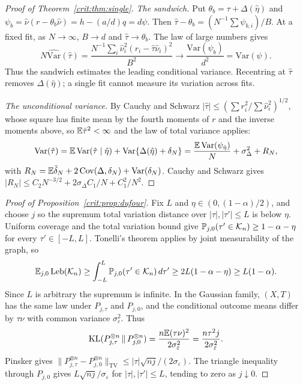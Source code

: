 \begin{proof}[Proof of Theorem~\ref{crit:thm:single}]
\emph{The sandwich.} Put $\theta_b=\tau+\Delta(\hat\eta)$ and $\psi_b=\hat\nu(r-\theta_b\hat\nu)=h-(a/d)q=d\psi$. Then $\hat\tau-\theta_b=(N^{-1}\sum\psi_{b,i})/B$. At a fixed fit, as $N\to\infty$, $B\to d$ and $\hat\tau\to\theta_b$. The law of large numbers gives
\[
N\widehat{\mathrm{Var}}(\hat\tau)=\frac{N^{-1}\sum_i\hat\nu_i^2(r_i-\hat\tau\hat\nu_i)^2}{B^2}\longrightarrow\frac{\mathrm{Var}(\psi_b)}{d^2}=\mathrm{Var}(\psi).
\]
Thus the sandwich estimates the leading conditional variance. Recentring at $\hat\tau$ removes $\Delta(\hat\eta)$; a single fit cannot measure its variation across fits.

\emph{The unconditional variance.} By Cauchy and Schwarz $|\hat\tau| \le (\sum r_i^2/\sum\hat\nu_i^2)^{1/2}$, whose square has finite mean by the fourth moments of $r$ and the inverse moments above, so $\mathbb{E}\hat\tau^2 < \infty$ and the law of total variance applies:
\[
\mathrm{Var}(\hat\tau) = \mathbb{E}\,\mathrm{Var}(\hat\tau \mid \hat\eta) + \mathrm{Var}\{\Delta(\hat\eta) + \delta_N\} = \frac{\mathbb{E}\,\mathrm{Var}(\psi_{\hat\eta})}{N} + \sigma_\Delta^2 + R_N,
\]
with $R_N = \mathbb{E}\tilde\delta_N + 2\,\mathrm{Cov}(\Delta, \delta_N) + \mathrm{Var}(\delta_N)$. Cauchy and Schwarz gives $|R_N| \le C_2N^{-3/2} + 2\sigma_\Delta C_1/N + C_1^2/N^2$.
\end{proof}

\begin{proof}[Proof of Proposition~\ref{crit:prop:dufour}]
Fix $L$ and $\eta\in(0,(1-\alpha)/2)$, and choose $j$ so the supremum total variation distance over $|\tau|,|\tau'|\le L$ is below $\eta$. Uniform coverage and the total variation bound give $\mathbb{P}_{j,0}(\tau'\in\mathcal K_n)\ge1-\alpha-\eta$ for every $\tau'\in[-L,L]$. Tonelli's theorem applies by joint measurability of the graph, so
\[
\mathbb{E}_{j,0}\,\mathrm{Leb}(\mathcal K_n)\ge\int_{-L}^{L}\mathbb{P}_{j,0}(\tau'\in\mathcal K_n)\,d\tau'\ge2L(1-\alpha-\eta)\ge L(1-\alpha).
\]
Since $L$ is arbitrary the supremum is infinite. In the Gaussian family, $(X,T)$ has the same law under $P_{j,\tau}$ and $P_{j,0}$, and the conditional outcome means differ by $\tau\nu$ with common variance $\sigma_\varepsilon^2$. Thus
\[
\mathrm{KL}(P_{j,\tau}^{\otimes n}\,\|\,P_{j,0}^{\otimes n})=\frac{n\mathbb{E}(\tau\nu)^2}{2\sigma_\varepsilon^2}=\frac{n\tau^2j}{2\sigma_\varepsilon^2}.
\]
Pinsker gives $\|P_{j,\tau}^{\otimes n}-P_{j,0}^{\otimes n}\|_{\mathrm{TV}}\le|\tau|\sqrt{nj}/(2\sigma_\varepsilon)$. The triangle inequality through $P_{j,0}$ gives $L\sqrt{nj}/\sigma_\varepsilon$ for $|\tau|,|\tau'|\le L$, tending to zero as $j\downarrow0$.
\end{proof}
